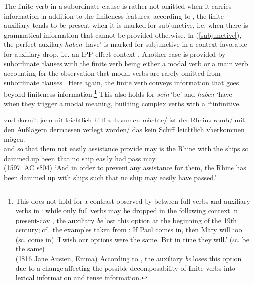\documentclass[output=paper,colorlinks,citecolor=brown]{langscibook}
\begin{document}
\largerpage
\noindent
The finite verb in a subordinate clause is rather not omitted when it carries information in addition to the finiteness features: according to \citet[442]{ERSW93}, the finite auxiliary tends to be present when it is marked for subjunctive, i.e. when there is grammatical information that cannot be provided otherwise. In (\ref{subjunctive}), the perfect auxilary \textit{haben} `have' is marked for subjunctive in a context favorable for auxiliary drop, i.e. an IPP-effect context \citep{haerd81}. Another case is provided by subordinate clauses with the finite verb being either a modal verb or a main verb accounting for the observation that modal verbs are rarely omitted from subordinate clauses \citep[486--492]{behaghel28}. Here again, the finite verb conveys information that goes beyond finiteness information.\footnote{This does not hold for a contrast observed by \citet{warner95} between full verbs and auxiliary verbs in : while only full verbs may be dropped in the following context in present-day , the auxiliary \textit{be} lost this option at the beginning of the 19th century; cf.\ the examples taken from \citet[537]{warner95}:
\eal
\ex If Paul comes in, then Mary will too. (sc. come in)
\ex `I wish our options were the same. But in time they will.' (sc. be the same)\\ \hfill (1816 Jane Austen, Emma) 
\zl
According to \citet{warner95}, the auxiliary \textit{be} loses this option due to a change affecting the possible decomposability of finite verbs into lexical information and tense information.  
}
This also holds for \textit{sein} `be' and \textit{haben} `have' when they trigger a modal meaning, building complex verbs with a $^{zu}$infinitive.

\ea \label{subjunctive}
\gll  vnd darmit jnen nit leichtlich hilff zukommen möchte/ ist der Rheinstromb/ mit den Außlägern dermassen verlegt worden/ das kein Schiff leichtlich  vberkommen mögen. \\ and so.that them not easily assistance provide may is the Rhine with the ships so dammed.up been that no ship easily had pass may   \\  \hfill (1597: AC s804)
\glt `And in order to prevent any assistance for them, the Rhine has been dammed up with ships such that no ship may easily have passed.'
\z

\end{document}
